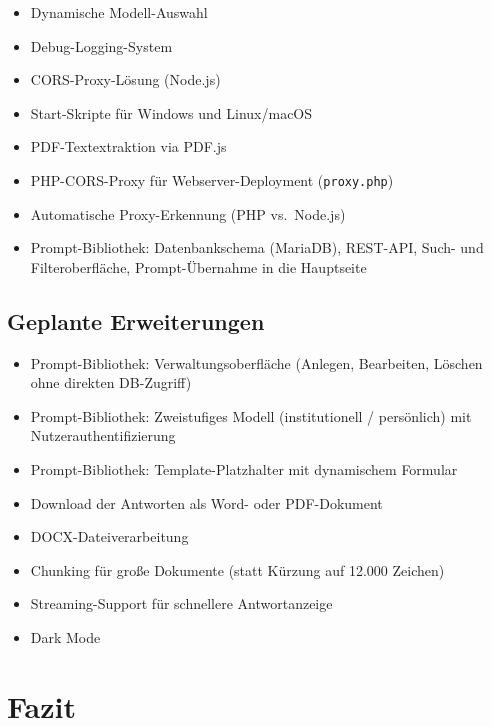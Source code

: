 \documentclass[12pt, a4paper]{article}
\begin{document}
\begin{itemize}[leftmargin=1.5cm]
  \item[$\checkmark$] Dynamische Modell-Auswahl
  \item[$\checkmark$] Debug-Logging-System
  \item[$\checkmark$] CORS-Proxy-Lösung (Node.js)
  \item[$\checkmark$] Start-Skripte für Windows und Linux/macOS
  \item[$\checkmark$] PDF-Textextraktion via PDF.js
  \item[$\checkmark$] PHP-CORS-Proxy für Webserver-Deployment (\texttt{proxy.php})
  \item[$\checkmark$] Automatische Proxy-Erkennung (PHP vs.\ Node.js)
  \item[$\checkmark$] Prompt-Bibliothek: Datenbankschema (MariaDB), REST-API, Such- und Filteroberfläche, Prompt-Übernahme in die Hauptseite
\end{itemize}

\subsection{Geplante Erweiterungen}

\begin{itemize}[leftmargin=1.5cm]
  \item Prompt-Bibliothek: Verwaltungsoberfläche (Anlegen, Bearbeiten, Löschen ohne direkten DB-Zugriff)
  \item Prompt-Bibliothek: Zweistufiges Modell (institutionell / persönlich) mit Nutzerauthentifizierung
  \item Prompt-Bibliothek: Template-Platzhalter mit dynamischem Formular
  \item Download der Antworten als Word- oder PDF-Dokument
  \item DOCX-Dateiverarbeitung
  \item Chunking für große Dokumente (statt Kürzung auf 12.000 Zeichen)
  \item Streaming-Support für schnellere Antwortanzeige
  \item Dark Mode
\end{itemize}

\section{Fazit}
\end{document}
